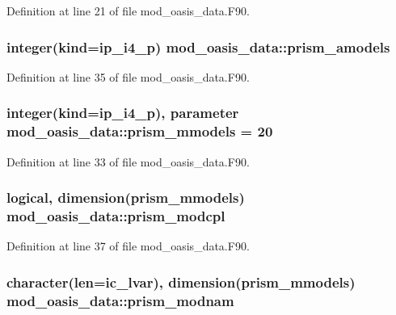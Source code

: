 Definition at line 21 of file mod\+\_\+oasis\+\_\+data.\+F90.

\hypertarget{classmod__oasis__data_ac73f95bc17215d09b67c6c4d3adc07b7}{
\subsubsection[{prism\+\_\+amodels}]{\setlength{\rightskip}{0pt plus 5cm}integer(kind=ip\+\_\+i4\+\_\+p) mod\+\_\+oasis\+\_\+data\+::prism\+\_\+amodels}}\label{classmod__oasis__data_ac73f95bc17215d09b67c6c4d3adc07b7}


Definition at line 35 of file mod\+\_\+oasis\+\_\+data.\+F90.

\hypertarget{classmod__oasis__data_a11c61975c048981f7e508f1b6caf16b6}{
\subsubsection[{prism\+\_\+mmodels}]{\setlength{\rightskip}{0pt plus 5cm}integer(kind=ip\+\_\+i4\+\_\+p), parameter mod\+\_\+oasis\+\_\+data\+::prism\+\_\+mmodels = 20}}\label{classmod__oasis__data_a11c61975c048981f7e508f1b6caf16b6}


Definition at line 33 of file mod\+\_\+oasis\+\_\+data.\+F90.

\hypertarget{classmod__oasis__data_ad5282716e60cbe5e8c1ced7758fc9ae1}{
\subsubsection[{prism\+\_\+modcpl}]{\setlength{\rightskip}{0pt plus 5cm}logical, dimension({\bf prism\+\_\+mmodels}) mod\+\_\+oasis\+\_\+data\+::prism\+\_\+modcpl}}\label{classmod__oasis__data_ad5282716e60cbe5e8c1ced7758fc9ae1}


Definition at line 37 of file mod\+\_\+oasis\+\_\+data.\+F90.

\hypertarget{classmod__oasis__data_abd4b98e9f321bc073d5a8e0292ba7131}{
\subsubsection[{prism\+\_\+modnam}]{\setlength{\rightskip}{0pt plus 5cm}character(len=ic\+\_\+lvar), dimension({\bf prism\+\_\+mmodels}) mod\+\_\+oasis\+\_\+data\+::prism\+\_\+modnam}}\label{classmod__oasis__data_abd4b98e9f321bc073d5a8e0292ba7131}



